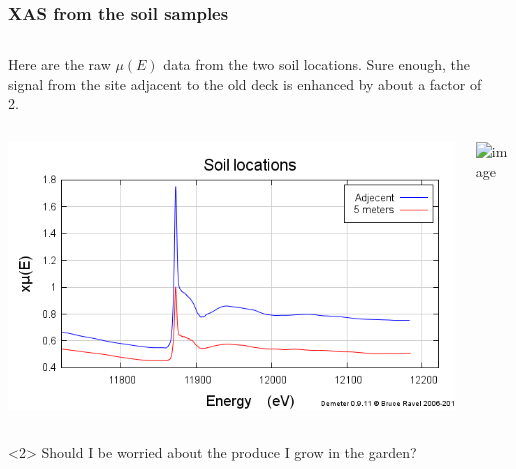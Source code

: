 \documentclass[10pt, xcolor=x11names, compress]{beamer}
\begin{document}
\begin{frame}
  \frametitle{XAS from the soil samples}

  \begin{columns}[T]
    \begin{column}{0.5\linewidth}
      Here are the raw $\mu(E)$ data from the two soil locations.
      Sure enough, the signal from the site adjacent to the old deck
      is enhanced by about a factor of 2.
    \end{column}
    \begin{column}{0.5\linewidth}
    \end{column}
  \end{columns}

  \medskip

  \begin{columns}[T]
    \begin{column}{0.5\linewidth}
      \includegraphics[width=\linewidth]{garden/mue.png}
    \end{column}
    \begin{column}{0.5\linewidth}
      \includegraphics<2>[width=\linewidth]{garden/soils.png}      
    \end{column}
  \end{columns}

  \begin{alertblock}<2>{}
    Should I be worried about the produce I grow in the garden?
  \end{alertblock}
\end{frame}
\end{document}
